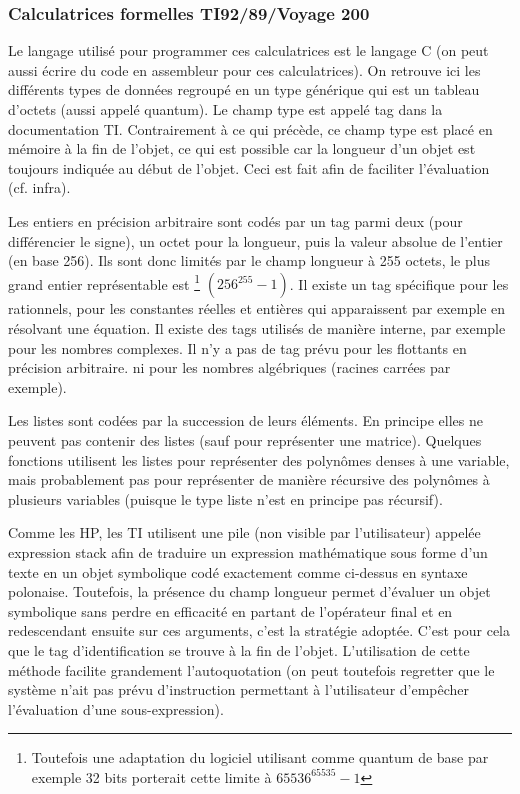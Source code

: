 \documentclass[a4paper,11pt]{article}
\begin{document}
\subsubsection{Calculatrices formelles TI92/89/Voyage 200}
Le langage utilis\'e pour programmer ces calculatrices est le langage C
(on peut aussi \'ecrire du code en assembleur pour ces calculatrices).
On retrouve ici les diff\'erents types de donn\'ees regroup\'e en un
type g\'en\'erique qui est un tableau d'octets (aussi appelé quantum). 
Le champ type
est appel\'e tag dans la documentation TI. Contrairement \`a ce qui
pr\'ec\`ede, ce champ type est plac\'e en m\'emoire \`a la fin de l'objet,
ce qui est possible car la longueur d'un objet est toujours indiqu\'ee
au d\'ebut de l'objet. Ceci est fait afin de faciliter l'évaluation (cf.
infra).

Les entiers en précision arbitraire sont codés par un tag parmi deux (pour
différencier le signe), un octet pour la longueur, puis la valeur
absolue de l'entier (en base 256). Ils sont donc limités par le
champ longueur à 255 octets, le plus grand entier représentable est
\footnote{Toutefois une adaptation du logiciel utilisant comme
quantum de base par exemple 32 bits porterait cette limite
à $65536^{65535}-1$} $(256^{255}-1)$.
Il existe un tag spécifique pour les rationnels, pour les constantes 
réelles et entières qui apparaissent par exemple en r\'esolvant une \'equation.
Il existe des tags utilisés de manière interne, par exemple
pour les nombres complexes. 
Il n'y a pas de tag prévu pour les flottants en précision arbitraire.
ni pour les nombres algébriques (racines carrées par 
exemple).

Les listes sont codées par la succession de leurs éléments. En principe
elles ne peuvent pas contenir des listes (sauf pour repr\'esenter
une matrice).
Quelques fonctions utilisent les listes pour représenter des polynômes 
denses à une variable, mais probablement pas pour représenter de manière
récursive des polynômes à plusieurs variables (puisque le type liste
n'est en principe pas récursif).

Comme les HP, les TI utilisent une pile (non visible par
l'utilisateur) appelée expression stack
afin de traduire un expression math\'ematique sous forme d'un texte
en un objet symbolique cod\'e exactement comme ci-dessus en syntaxe
polonaise. Toutefois, la pr\'esence du champ longueur
permet d'\'evaluer un objet symbolique sans perdre en efficacit\'e
en partant de l'op\'erateur
final et en redescendant ensuite sur ces arguments, c'est la stratégie
adoptée. C'est pour cela que le tag d'identification
se trouve à la fin de l'objet. L'utilisation de cette méthode
facilite grandement l'autoquotation (on peut toutefois regretter
que le système n'ait pas prévu d'instruction permettant à l'utilisateur 
d'emp\^echer l'évaluation d'une sous-expression).
\end{document}
